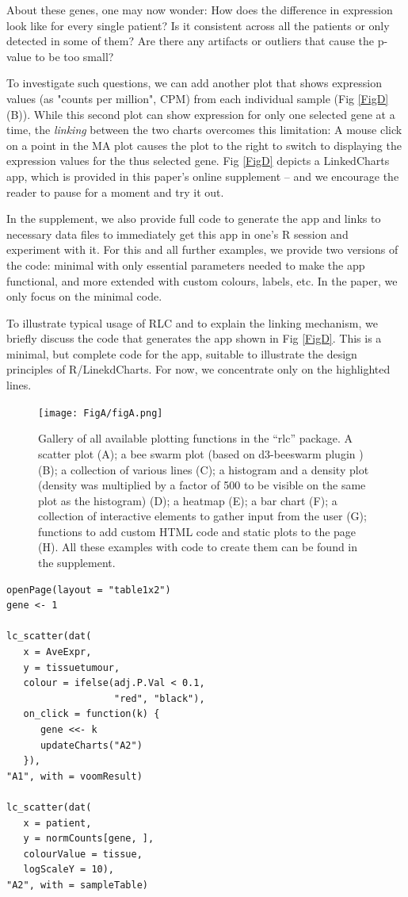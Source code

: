 \documentclass[twocolumn,10pt]{article}
\begin{document}
About these genes, one may now wonder: How does the difference in expression look like for every single patient? Is it consistent across all the patients or only detected in some of them? Are there any artifacts or outliers that cause the p-value to be too small?

To investigate such questions, we can add another plot that shows expression values (as "counts per million", CPM) from each individual sample (Fig \ref{FigD}(B)). While this second plot can show expression for only one selected gene at a time, the \emph{linking} between the two charts  overcomes this limitation: A mouse click on a point in the MA plot causes the plot to the right to switch to displaying the expression values for the thus selected gene. Fig \ref{FigD} depicts a LinkedCharts app, which is provided in this paper's online supplement -- and we encourage the reader to pause for a moment and try it out. 

In the supplement, we also provide full code to generate the app and links to necessary data files to immediately get this app in one's R session and experiment with it. For this and all further examples, we provide two versions of the code: minimal with only essential parameters needed to make the app functional, and more extended with custom colours, labels, etc. In the paper, we only focus on the minimal code.

To illustrate typical usage of RLC and to explain the linking mechanism, we briefly discuss the code that generates the app shown in Fig \ref{FigD}. This is a minimal, but complete code for the app, suitable to illustrate the design principles of R/LinekdCharts. For now, we concentrate only on the highlighted lines.

\begin{figure}[b]
	\texttt{[image: FigA/figA.png]}
	\caption{Gallery of all available plotting functions in the ``rlc'' package. A scatter plot (A); a bee swarm plot (based on d3-beeswarm plugin \citep{lebeau_2017}) (B); a collection of various lines (C); a histogram and a density plot (density was multiplied by a factor of 500 to be visible on the same plot as the histogram) (D); a heatmap (E); a bar chart (F); a collection of interactive elements to gather input from the user (G); functions to add custom HTML code and static plots to the page (H). All these examples with code to create them can be found in the supplement.}
	\label{FigA}
\end{figure}

\begin{verbatim}
openPage(layout = "table1x2")
gene <- 1

lc_scatter(dat(
   x = AveExpr,
   y = tissuetumour,
   colour = ifelse(adj.P.Val < 0.1, 
                   "red", "black"),
   on_click = function(k) {
      gene <<- k
      updateCharts("A2")
   }),
"A1", with = voomResult)

lc_scatter(dat(
   x = patient,
   y = normCounts[gene, ],
   colourValue = tissue, 
   logScaleY = 10),
"A2", with = sampleTable)
\end{verbatim}
\end{document}

